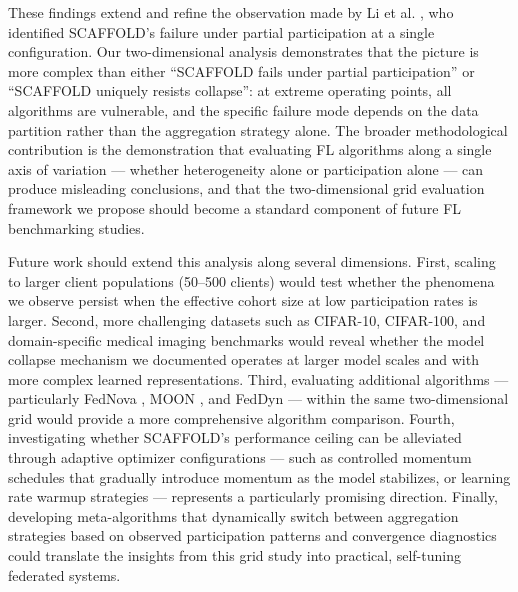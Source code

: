 \documentclass[conference]{IEEEtran}
\begin{document}
These findings extend and refine the observation made by Li et al. \cite{li2022niid}, who identified SCAFFOLD's failure under partial participation at a single configuration. Our two-dimensional analysis demonstrates that the picture is more complex than either ``SCAFFOLD fails under partial participation'' or ``SCAFFOLD uniquely resists collapse'': at extreme operating points, all algorithms are vulnerable, and the specific failure mode depends on the data partition rather than the aggregation strategy alone. The broader methodological contribution is the demonstration that evaluating FL algorithms along a single axis of variation --- whether heterogeneity alone or participation alone --- can produce misleading conclusions, and that the two-dimensional grid evaluation framework we propose should become a standard component of future FL benchmarking studies.

Future work should extend this analysis along several dimensions. First, scaling to larger client populations (50--500 clients) would test whether the phenomena we observe persist when the effective cohort size at low participation rates is larger. Second, more challenging datasets such as CIFAR-10, CIFAR-100, and domain-specific medical imaging benchmarks would reveal whether the model collapse mechanism we documented operates at larger model scales and with more complex learned representations. Third, evaluating additional algorithms --- particularly FedNova \cite{wang2020fednova}, MOON \cite{li2021moon}, and FedDyn \cite{acar2021feddyn} --- within the same two-dimensional grid would provide a more comprehensive algorithm comparison. Fourth, investigating whether SCAFFOLD's performance ceiling can be alleviated through adaptive optimizer configurations --- such as controlled momentum schedules that gradually introduce momentum as the model stabilizes, or learning rate warmup strategies --- represents a particularly promising direction. Finally, developing meta-algorithms that dynamically switch between aggregation strategies based on observed participation patterns and convergence diagnostics could translate the insights from this grid study into practical, self-tuning federated systems.
\end{document}
